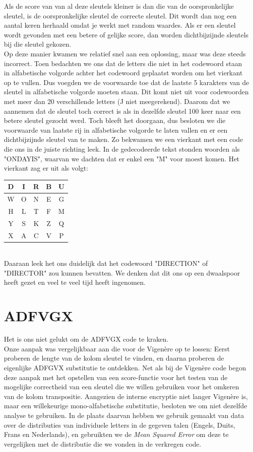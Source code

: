 \documentclass[fleqn]{article}
\begin{document}
	Als de score van van al deze sleutels kleiner is dan die van de oorspronkelijke sleutel, is de oorspronkelijke sleutel de correcte sleutel. Dit wordt dan nog een aantal keren herhaald omdat je werkt met random waardes. Als er een sleutel wordt gevonden met een betere of gelijke score, dan worden dichtbijzijnde sleutels bij die sleutel gekozen.\\
	Op deze manier kwamen we relatief snel aan een oplossing, maar was deze steeds incorrect. Toen bedachten we ons dat de letters die niet in het codewoord staan in alfabetische volgorde achter het codewoord geplaatst worden om het vierkant op te vullen. Dus voegden we de voorwaarde toe dat de laatste 5 karakters van de sleutel in alfabetische volgorde moeten staan. Dit komt niet uit voor codewoorden met meer dan 20 verschillende letters (J niet meegerekend). Daarom dat we aannemen dat de sleutel toch correct is als in dezelfde sleutel 100 keer naar een betere sleutel gezocht werd. Toch bleeft het doorgaan, dus besloten we die voorwaarde van laatste rij in alfabetische volgorde te laten vallen en er een dichtbijzijnde sleutel van te maken. Zo bekwamen we een vierkant met een code die ons in de juiste richting leek. In de gedecodeerde tekst stonden woorden als "ONDAYIS", waarvan we dachten dat er enkel een "M" voor moest komen. Het vierkant zag er uit als volgt:
	\\
	\begin{tabular}{|c|c|c|c|c|}
		\hline 
		D & I & R & B & U \\ 
		\hline 
		W & O & N & E & G \\ 
		\hline 
		H & L & T & F & M \\ 
		\hline 
		Y & S & K & Z & Q \\ 
		\hline 
		X & A & C & V & P \\ 
		\hline 
	\end{tabular} 
	\\
	Daaraan leek het ons duidelijk dat het codewoord "DIRECTION" of "DIRECTOR" zou kunnen bevatten. We denken dat dit ons op een dwaalspoor heeft gezet en veel te veel tijd heeft ingenomen.
	\section{ADFVGX}
	Het is ons niet gelukt om de ADFVGX code te kraken.\\
	Onze aanpak was vergelijkbaar aan die voor de Vigen\`ere op te lossen: Eerst proberen de lengte van de kolom sleutel te vinden, en daarna proberen de eigenlijke ADFGVX substitutie te ontdekken. Net als bij de Vigen\`ere code begon deze aanpak met het opstellen van een score-functie voor het testen van de mogelijke correctheid van een sleutel die we willen gebruiken voor het omkeren van de kolom transpositie. Aangezien de interne encryptie niet langer Vigen\`ere is, maar een willekeurige mono-alfabetische substitutie, besloten we om niet dezelfde analyse te gebruiken. In de plaats daarvan hebben we gebruik gemaakt van data over de distributies van individuele letters in de gegeven talen (Engels, Duits, Frans en Nederlands), en gebruikten we de \textit{Mean Squared Error} om deze te vergelijken met de distributie die we vonden in de verkregen code.
	
\end{document}

